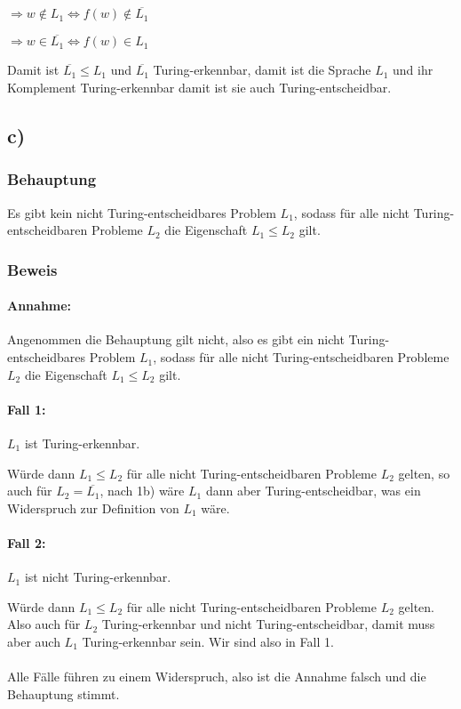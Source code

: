 $\Rightarrow  w \notin L_1 \Leftrightarrow f(w) \notin \overline{L_1}$

$\Rightarrow w \in \overline{L_1} \Leftrightarrow f(w) \in L_1$

Damit ist $\overline{L_1} \leq L_1$ und $\overline{L_1}$ Turing-erkennbar, damit ist die Sprache $L_1$ und ihr Komplement Turing-erkennbar damit ist sie auch Turing-entscheidbar.


\subsection*{c)}

\subsubsection*{Behauptung}


Es gibt kein nicht Turing-entscheidbares Problem $L_1$, sodass für alle nicht Turing-entscheidbaren
Probleme $L_2$ die Eigenschaft $L_1 \leq L_2$ gilt.

\subsubsection*{Beweis}

\paragraph*{Annahme:} Angenommen die Behauptung gilt nicht, also es gibt ein nicht Turing-entscheidbares Problem $L_1$, sodass für alle nicht Turing-entscheidbaren
Probleme $L_2$ die Eigenschaft $L_1 \leq L_2$ gilt.

\paragraph*{Fall 1:}
$L_1$ ist Turing-erkennbar.

Würde dann $L_1 \leq L_2$ für alle nicht Turing-entscheidbaren Probleme $L_2$ gelten, so auch für $L_2 = \overline{L_1}$, nach 1b) wäre $L_1$ dann aber Turing-entscheidbar, was ein Widerspruch zur Definition von $L_1$ wäre.

\paragraph*{Fall 2:}
$L_1$ ist nicht Turing-erkennbar.

Würde dann $L_1 \leq L_2$ für alle nicht Turing-entscheidbaren Probleme $L_2$ gelten.
Also auch für $L_2$ Turing-erkennbar und nicht Turing-entscheidbar, damit muss aber auch $L_1$ Turing-erkennbar sein. Wir sind also in Fall 1.

\paragraph*{}

Alle Fälle führen zu einem Widerspruch, also ist die Annahme falsch und die Behauptung stimmt.



